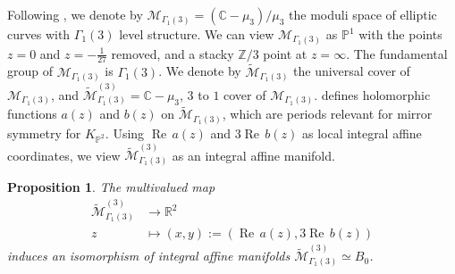 \documentclass[11pt,letterpaper]{amsart}
\newtheorem{prop}[defn]{Proposition}
\newcommand\C{\mathbb C}
\newcommand\PP{\mathbb P}
\newcommand\R{\mathbb R}
\newcommand\Z{\mathbb Z}
\newcommand\cM{\mathcal M}
\newcommand\Rea{\operatorname{Re}\,}
\begin{document}
Following \cite[\S 9]{MR2852118}, we denote
by $\cM_{\Gamma_1(3)}=(\C-\mu_3)/\mu_3$ the moduli space of elliptic curves with 
$\Gamma_1(3)$ level structure. We can view 
$\cM_{\Gamma_1(3)}$ as 
$\PP^1$ with the points $z=0$ and $z=-\frac{1}{27}$ removed, and a stacky 
$\Z/3$ point at $z=\infty$. The fundamental group of $\cM_{\Gamma_1(3)}$ is 
$\Gamma_1(3)$. We denote by
$\widetilde{\cM}_{\Gamma_1(3)}$ the universal cover of $\cM_{\Gamma_1(3)}$, and $\widetilde{\cM}^{(3)}_{\Gamma_1(3)}=\C-\mu_3$, $3$ to $1$ cover of $\cM_{\Gamma_1(3)}$. 
\cite[Equation (22)]{MR2852118} defines holomorphic functions $a(z)$ and $b(z)$ on
$\widetilde{\cM}_{\Gamma_1(3)}$, which are periods relevant for mirror symmetry for 
$K_{\PP^2}$. Using $\Rea a(z)$ and 
$3 \Rea b(z)$ as local integral affine coordinates, we view
$\widetilde{\cM}^{(3)}_{\Gamma_1(3)}$ 
as an integral affine manifold.




\begin{prop} \label{prop_integral_affine}
The multivalued map 
\begin{align*} \widetilde{\cM}^{(3)}_{\Gamma_1(3)}& \longrightarrow \R^2 \\
z &\longmapsto (x,y) :=(\Rea a(z), 3\Rea b(z))\end{align*}
induces an isomorphism of integral affine manifolds 
$\widetilde{\cM}_{\Gamma_1(3)}^{(3)} \simeq B_0$.
\end{prop}
\end{document}
